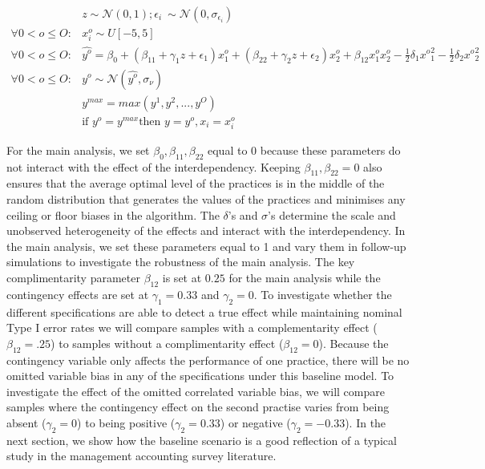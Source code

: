 \documentclass[12pt]{article}
\begin{document}
\begin{equation}\label{eq:firm-simulation}
\begin{aligned}
	&z \sim \mathcal{N}(0, 1); \epsilon_i ~ \sim \mathcal{N}(0, \sigma_{\epsilon_i}) \\
    \forall 0 < o \leq O: &x^o_i \sim U[-5,5] \\
    \forall 0 < o \leq O: &\hat{y^o} = \beta_0 + (\beta_{11} + \gamma_1 z + \epsilon_1) x^o_1 
						+ (\beta_{22} + \gamma_2 z  + \epsilon_2) x^o_2 
                        + \beta_{12} x^o_1 x^o_2 - \frac{1}{2}\delta_1 {x^o}^2_1 - \frac{1}{2}\delta_2 {x^o}^2_2 \\
     \forall 0 < o \leq O: &y^o \sim \mathcal{N}(\hat{y^o}, \sigma_{\nu}) \\
	 &y^{max} = max(y^1, y^2, ..., y^O)  \\
     &\text{if } y^o = y^{max} \text{then } y = y^o, x_i = x^o_i
\end{aligned}
\end{equation}

For the main analysis, we set $\beta_0, \beta_{11}, \beta_{22}$ equal to $0$ because these parameters do not interact with the effect of the interdependency. Keeping $\beta_{11}, \beta_{22} = 0$ also ensures that the average optimal level of the practices is in the middle of the random distribution that generates the values of the practices and minimises any ceiling or floor biases in the algorithm. The $\delta$'s and $\sigma$'s determine the scale and unobserved heterogeneity of the effects and interact with the interdependency. In the main analysis, we set these parameters equal to 1 and vary them in follow-up simulations to investigate the robustness of the main analysis. The key complimentarity parameter $\beta_{12}$ is set at $0.25$ for the main analysis while the contingency effects are set at $\gamma_1 = 0.33$ and $\gamma_2 = 0$. To investigate whether the different specifications are able to detect a true effect while maintaining nominal Type I error rates we will compare samples with a complementarity effect ($\beta_{12} = .25$) to samples without a complimentarity effect ($\beta_{12} = 0$). Because the contingency variable only affects the performance of one practice, there will be no omitted variable bias in any of the specifications under this baseline model. To investigate the effect of the omitted correlated variable bias, we will compare samples where the contingency effect on the second practise varies from being absent ($\gamma_2 = 0$) to being positive ($\gamma_2 = 0.33$) or negative ($\gamma_2 = -0.33$).  In the next section, we show how the baseline scenario is a good reflection of a typical study in the management accounting survey literature.
\end{document}
